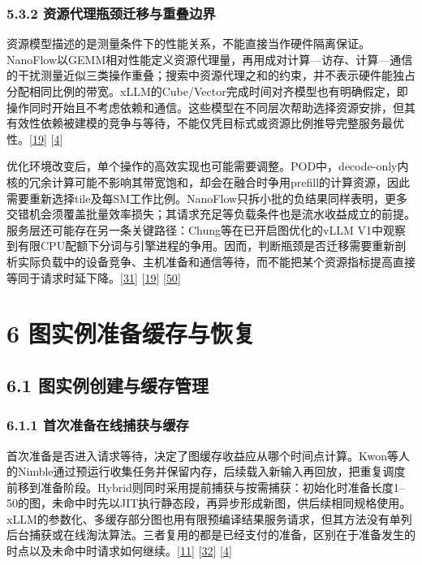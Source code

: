 \documentclass[
  11pt,
  UTF8]{ctexart}
\begin{document}
\hypertarget{section-5-3-2}{%
\subsubsection{5.3.2 资源代理瓶颈迁移与重叠边界}\label{section-5-3-2}}

资源模型描述的是测量条件下的性能关系，不能直接当作硬件隔离保证。NanoFlow以GEMM相对性能定义资源代理量，再用成对计算---访存、计算---通信的干扰测量近似三类操作重叠；搜索中资源代理之和的约束，并不表示硬件能独占分配相同比例的带宽。xLLM的Cube/Vector完成时间对齐模型也有明确假定，即操作同时开始且不考虑依赖和通信。这些模型在不同层次帮助选择资源安排，但其有效性依赖被建模的竞争与等待，不能仅凭目标式或资源比例推导完整服务最优性。{[}\protect\hyperlink{ref-zhu2025nanoflow}{19}{]}
{[}\protect\hyperlink{ref-liu2025xllm}{4}{]}

优化环境改变后，单个操作的高效实现也可能需要调整。POD中，decode-only内核的冗余计算可能不影响其带宽饱和，却会在融合时争用prefill的计算资源，因此需要重新选择tile及每SM工作比例。NanoFlow只拆小批的负结果同样表明，更多交错机会须覆盖批量效率损失；其请求充足等负载条件也是流水收益成立的前提。服务层还可能存在另一条关键路径：Chung等在已开启图优化的vLLM
V1中观察到有限CPU配额下分词与引擎进程的争用。因而，判断瓶颈是否迁移需要重新剖析实际负载中的设备竞争、主机准备和通信等待，而不能把某个资源指标提高直接等同于请求时延下降。{[}\protect\hyperlink{ref-kamath2025pod}{31}{]}
{[}\protect\hyperlink{ref-zhu2025nanoflow}{19}{]}
{[}\protect\hyperlink{ref-chung2026cpu}{50}{]}

\hypertarget{section-6}{%
\section{6 图实例准备缓存与恢复}\label{section-6}}

\hypertarget{section-6-1}{%
\subsection{6.1 图实例创建与缓存管理}\label{section-6-1}}

\hypertarget{section-6-1-1}{%
\subsubsection{6.1.1 首次准备在线捕获与缓存}\label{section-6-1-1}}

首次准备是否进入请求等待，决定了图缓存收益应从哪个时间点计算。Kwon等人的Nimble通过预运行收集任务并保留内存，后续载入新输入再回放，把重复调度前移到准备阶段。Hybrid则同时采用提前捕获与按需捕获：初始化时准备长度1--50的图，未命中时先以JIT执行静态段，再异步形成新图，供后续相同规格使用。xLLM的参数化、多缓存部分图也用有限预编译结果服务请求，但其方法没有单列后台捕获或在线淘汰算法。三者复用的都是已经支付的准备，区别在于准备发生的时点以及未命中时请求如何继续。{[}\protect\hyperlink{ref-kwon2020nimble}{11}{]}
{[}\protect\hyperlink{ref-yadav2026hybridpreprint}{32}{]}
{[}\protect\hyperlink{ref-liu2025xllm}{4}{]}
\end{document}
